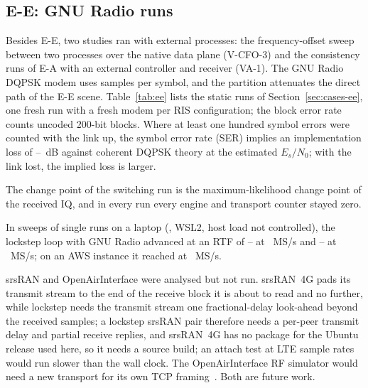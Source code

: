 \subsection{E-E: GNU Radio runs}

Besides E-E, two studies ran with external processes: the frequency-offset sweep
between two processes over the native data plane (V-CFO-3) and the consistency runs of E-A with
an external controller and receiver (VA-1). The GNU Radio DQPSK modem uses \numEeSps{} samples per symbol,
and the partition attenuates the direct path of the E-E scene.
Table~\ref{tab:ee} lists the static runs of Section~\ref{sec:cases-ee}, one
fresh run with a fresh modem per RIS configuration; the block error rate counts uncoded
200-bit blocks. Where at least one hundred symbol errors were counted with the link up, the
symbol error rate (SER) implies
an implementation loss of \numEeLossMinDb--\numEeLossMaxDb~dB against coherent DQPSK theory at
the estimated $E_s/N_0$; with the link lost, the implied loss is larger.

The change point of the switching run is the maximum-likelihood change
point of the received IQ, and in every run every engine and transport counter stayed zero.

In \txtEeLaptopSweeps{} sweeps of single runs on a laptop (\txtEeLaptopCpu{}, WSL2,
host load not controlled), the lockstep loop with GNU Radio advanced at an RTF of
\numEeLaptopRtfLoMin--\numEeLaptopRtfLoMax{} at \numEeRateMsps~MS/s and
\numEeLaptopRtfHiMin--\numEeLaptopRtfHiMax{} at \numEeLaptopRateHiMsps~MS/s; on an AWS
\txtEeAwsInstance{} instance it reached \numEeAwsRtfLo{} at \numEeRateMsps~MS/s.

srsRAN and OpenAirInterface were analysed but not run. srsRAN~4G pads its
transmit stream to the end of the receive block it is about to read and no further, while
lockstep needs the transmit stream one fractional-delay look-ahead beyond the received
samples; a lockstep srsRAN pair therefore needs a per-peer transmit delay and partial receive
replies, and srsRAN~4G has no package for the Ubuntu release used here, so it needs a source
build; an attach test at LTE sample rates would run slower than the wall clock. The
OpenAirInterface
RF simulator would need a new transport for its own TCP framing~\cite{OAIrfsim}. Both are
future work.
